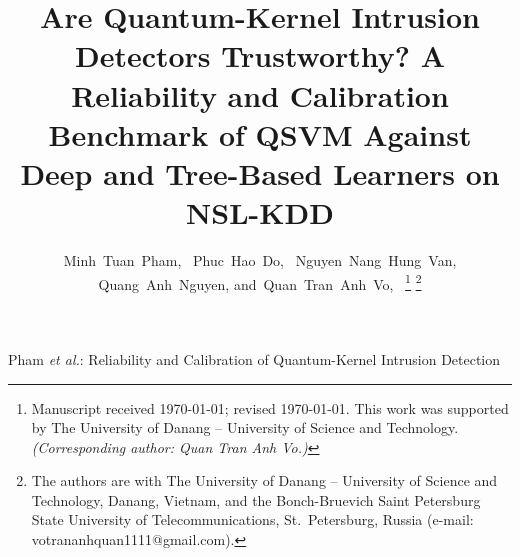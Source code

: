 \documentclass[journal]{IEEEtran}
\begin{document}
\title{Are Quantum-Kernel Intrusion Detectors Trustworthy?
  A Reliability and Calibration Benchmark of QSVM Against Deep
  and Tree-Based Learners on NSL-KDD}

\author{Minh~Tuan~Pham,~
        Phuc~Hao~Do,~
        Nguyen~Nang~Hung~Van,
        Quang~Anh~Nguyen,
        and~Quan~Tran~Anh~Vo,~
\thanks{Manuscript received \today; revised \today. This work was
  supported by The University of Danang -- University of Science and
  Technology. \textit{(Corresponding author: Quan Tran Anh Vo.)}}
\thanks{The authors are with The University of Danang -- University of
  Science and Technology, Danang, Vietnam, and the Bonch-Bruevich Saint
  Petersburg State University of Telecommunications, St.~Petersburg,
  Russia (e-mail: votrananhquan1111@gmail.com).}}

%
{Pham \MakeLowercase{\textit{et al.}}: Reliability and Calibration of Quantum-Kernel Intrusion Detection}

\maketitle
\end{document}
